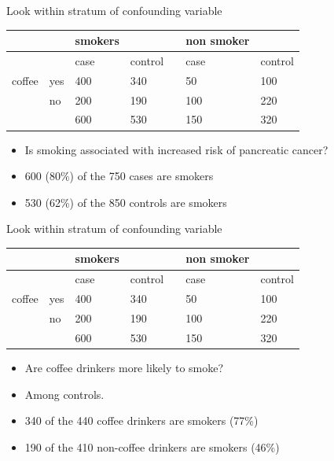\documentclass[ignorenonframetext,]{beamer}
\begin{document}
\begin{frame}{Look within stratum of confounding variable}

\begin{longtable}[c]{@{}lllllll@{}}
\toprule
& & smokers & & & non smoker &\tabularnewline
\midrule
\endhead
& & case & control & & case & control\tabularnewline
coffee & yes & 400 & 340 & & 50 & 100\tabularnewline
& no & 200 & 190 & & 100 & 220\tabularnewline
& & 600 & 530 & & 150 & 320\tabularnewline
\bottomrule
\end{longtable}

\begin{itemize}
\itemsep1pt\parskip0pt
\item
  Is smoking associated with increased risk of pancreatic cancer?
\item
  600 (80\%) of the 750 cases are smokers
\item
  530 (62\%) of the 850 controls are smokers
\end{itemize}

\end{frame}

\begin{frame}{Look within stratum of confounding variable}

\begin{longtable}[c]{@{}lllllll@{}}
\toprule
& & smokers & & & non smoker &\tabularnewline
\midrule
\endhead
& & case & control & & case & control\tabularnewline
coffee & yes & 400 & 340 & & 50 & 100\tabularnewline
& no & 200 & 190 & & 100 & 220\tabularnewline
& & 600 & 530 & & 150 & 320\tabularnewline
\bottomrule
\end{longtable}

\begin{itemize}
\itemsep1pt\parskip0pt
\item
  Are coffee drinkers more likely to smoke?
\item
  Among controls.
\item
  340 of the 440 coffee drinkers are smokers (77\%)
\item
  190 of the 410 non-coffee drinkers are smokers (46\%)
\end{itemize}

\end{frame}
\end{document}
